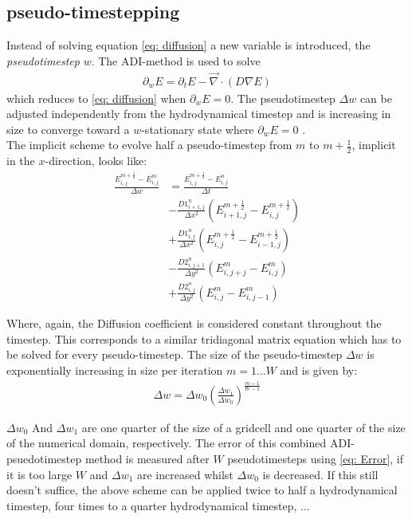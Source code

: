 
\subsection{pseudo-timestepping}
Instead of solving equation \eqref{eq: diffusion} a new variable is introduced, the \emph{pseudotimestep} $w$. The ADI-method is used to solve 
\begin{align}
\partial_w E = \partial_t E  - \vec{\nabla} \cdot \left(D \nabla E\right)
\end{align}
which reduces to \eqref{eq: diffusion} when $\partial_w E = 0$. The pseudotimestep $\Delta w$ can be adjusted independently from the hydrodynamical timestep and is increasing in size to converge toward a $w$-stationary state where $\partial_w E = 0$ \cite{Turner12001}.\\

The implicit scheme to evolve half a pseudo-timestep from $m$ to $m + \frac{1}{2}$, implicit in the $x$-direction, looks like:
\begin{align}
\frac{E_{i,j}^{m+\frac{1}{2}} - E_{i,j}^{m}}{\Delta w} 
 &= \frac{E_{i,j}^{m+\frac{1}{2}} - E_{i,j}^{n}}{\Delta t} \\
 &- \frac{D1_{i+1,j}^{n}}{\Delta x^2} (E_{i+1,j}^{m+\frac{1}{2}} - E_{i,j}^{m+\frac{1}{2}}) \\
 &+ \frac{D1_{i,j}^{n}}{\Delta x^2} (E_{i,j}^{m+\frac{1}{2}} - E_{i-1,j}^{m+\frac{1}{2}}) \\
 &- \frac{D2_{i,j+1}^{n}}{\Delta y^2} (E_{i,j+j}^{m} - E_{i,j}^{m}) \\
 &+ \frac{D2_{i,j}^{n}}{\Delta y^2} (E_{i,j}^{m} - E_{i,j-1}^{m})
\end{align}

Where, again, the Diffusion coefficient is considered constant throughout the timestep. This corresponds to a similar tridiagonal matrix equation which has to be solved for every pseudo-timestep. The size of the pseudo-timestep $\Delta w$ is exponentially increasing in size per iteration $m = 1 ... W$ and is given by:
\begin{align}
\Delta w = \Delta w_0 \left(\frac{\Delta w_1}{\Delta w_0} \right)^\frac{m-1}{W-1}
\end{align}

$\Delta w_0$ And $\Delta w_1$ are one quarter of the size of a gridcell and one quarter of the size of the numerical domain, respectively. The error of this combined ADI-psuedotimestep method is measured after $W$ pseudotimesteps using \eqref{eq: Error}, if it is too large $W$ and $\Delta w_1$ are increased whilst $\Delta w_0$ is decreased. If this still doesn't suffice, the above scheme can be applied twice to half a hydrodynamical timestep, four times to a quarter hydrodynamical timestep, ... 

